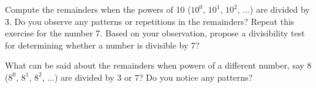 \documentclass[a4paper,12pt]{article}
\begin{document}
Compute the remainders when the powers of 10 ($10^0$, $10^1$, $10^2$, $\ldots$) are divided by 3. Do you observe any patterns or repetitions in the remainders? Repeat this exercise for the number 7. Based on your observation, propose a divisibility test for determining whether a number is divisible by 7?

What can be said about the remainders when powers of a different number, say 8 ($8^0$, $8^1$, $8^2$, $\ldots$) are divided by 3 or 7? Do you notice any patterns?
\end{document}
